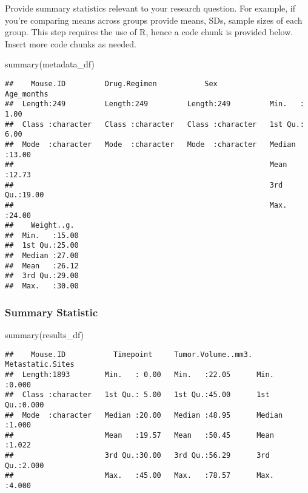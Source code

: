 \documentclass[
]{article}
\newenvironment{Shaded}{\begin{snugshade}}{\end{snugshade}}
\newcommand{\FunctionTok}[1]{\textcolor[rgb]{0.00,0.00,0.00}{#1}}
\newcommand{\NormalTok}[1]{#1}
\begin{document}
Provide summary statistics relevant to your research question. For
example, if you're comparing means across groups provide means, SDs,
sample sizes of each group. This step requires the use of R, hence a
code chunk is provided below. Insert more code chunks as needed.

\begin{Shaded}
\begin{Highlighting}[]
\FunctionTok{summary}\NormalTok{(metadata\_df)}
\end{Highlighting}
\end{Shaded}

\begin{verbatim}
##    Mouse.ID         Drug.Regimen           Sex              Age_months   
##  Length:249         Length:249         Length:249         Min.   : 1.00  
##  Class :character   Class :character   Class :character   1st Qu.: 6.00  
##  Mode  :character   Mode  :character   Mode  :character   Median :13.00  
##                                                           Mean   :12.73  
##                                                           3rd Qu.:19.00  
##                                                           Max.   :24.00  
##    Weight..g.   
##  Min.   :15.00  
##  1st Qu.:25.00  
##  Median :27.00  
##  Mean   :26.12  
##  3rd Qu.:29.00  
##  Max.   :30.00
\end{verbatim}

\hypertarget{summary-statistic}{%
\subsubsection{Summary Statistic}\label{summary-statistic}}

\begin{Shaded}
\begin{Highlighting}[]
\FunctionTok{summary}\NormalTok{(results\_df)}
\end{Highlighting}
\end{Shaded}

\begin{verbatim}
##    Mouse.ID           Timepoint     Tumor.Volume..mm3. Metastatic.Sites
##  Length:1893        Min.   : 0.00   Min.   :22.05      Min.   :0.000   
##  Class :character   1st Qu.: 5.00   1st Qu.:45.00      1st Qu.:0.000   
##  Mode  :character   Median :20.00   Median :48.95      Median :1.000   
##                     Mean   :19.57   Mean   :50.45      Mean   :1.022   
##                     3rd Qu.:30.00   3rd Qu.:56.29      3rd Qu.:2.000   
##                     Max.   :45.00   Max.   :78.57      Max.   :4.000
\end{verbatim}
\end{document}
